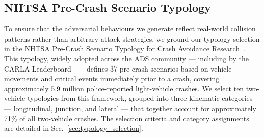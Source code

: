 


\subsection{NHTSA Pre-Crash Scenario Typology}\label{sec:NHTSA}

To ensure that the adversarial behaviours we generate reflect real-world collision patterns rather than arbitrary attack strategies, we ground our typology selection in the NHTSA Pre-Crash Scenario Typology for Crash Avoidance Research~\cite{noauthor_pre-crash_nodate}. This typology, widely adopted across the ADS community --- including by the CARLA Leaderboard~\cite{noauthor_carla_nodate} --- defines 37 pre-crash scenarios based on vehicle movements and critical events immediately prior to a crash, covering approximately 5.9 million police-reported light-vehicle crashes. We select ten two-vehicle typologies from this framework, grouped into three kinematic categories --- longitudinal, junction, and lateral --- that together account for approximately 71\% of all two-vehicle crashes. The selection criteria and category assignments are detailed in Sec.~\ref{sec:typology_selection}.

